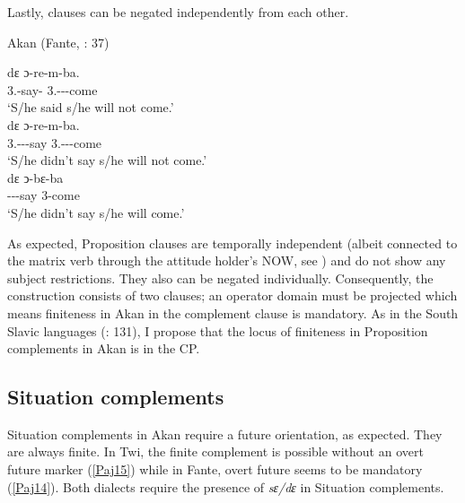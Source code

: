 \documentclass[output=paper]{langscibook}
\begin{document}
Lastly, clauses can be negated independently from each other. 

\begin{exe}
\ex \label{Paj13} Akan (Fante, \citealt{osam1998}: 37)
\begin{xlist}

\ex \label{Paj13a} 
 {d{ɛ}} {{ɔ}-re-m-ba.} \\
    3{\sg}.{\subj}-say-{\compl} {\comp} 3{\sg}.{\subj}-{\prog}--come\\
\glt `S/he said s/he will not come.’\\

\ex \label{Paj13b} 
 {d{ɛ}} {{ɔ}-re-m-ba.} \\
    3{\sg}.{\subj}-{\compl}--say {\comp} 3{\sg}.{\subj}-{\prog}--come\\
\glt `S/he didn't say s/he will not come.’\\

\ex \label{Paj13c} 
 dɛ ͻ-bɛ-ba \\
-\compl--say {\comp} 3-come\\
\glt `S/he didn’t say s/he will come.'\\

\end{xlist}
\end{exe}
 

As expected, Proposition clauses are temporally independent (albeit connected to the matrix verb through the attitude holder’s NOW, see \citealt{wurmbrand2014a}) and do not show any subject restrictions. They also can be negated individually. Consequently, the construction consists of two clauses; an operator domain must be projected which means finiteness in Akan in the complement clause is mandatory. As in the South Slavic languages (\citealt{wurmbrandetal2020}: 131), I propose that the locus of finiteness in Proposition complements in Akan is in the CP. 

\subsection{Situation complements}

Situation complements in Akan require a future orientation, as expected. They are always finite. In Twi, the finite complement is possible without an overt future marker (\ref{Paj15}) while in Fante, overt future seems to be mandatory (\ref{Paj14}). Both dialects require the presence of \textit{sɛ/dɛ} in Situation complements. 
\end{document}
